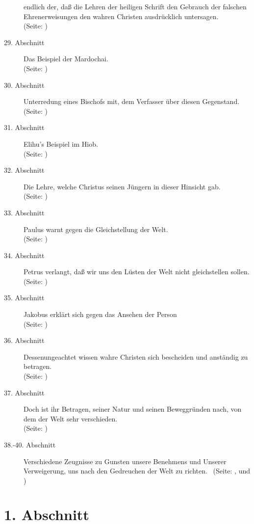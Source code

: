 \begin{description}
endlich der,
daß die Lehren der heiligen Schrift den Gebrauch der falschen Ehrenerweisungen
den wahren Christen ausdrücklich untersagen.
\\ (Seite: \pageref{kap9_ab28})
\item[29. Abschnitt] Das Beispiel der Mardochai.
\\ (Seite: \pageref{kap9_ab29})
\item[30. Abschnitt] Unterredung eines Bischofs mit, dem Verfasser über diesen
Gegenstand.
\\ (Seite: \pageref{kap9_ab30})
\item[31. Abschnitt] Elihu's Beispiel im Hiob.
\\ (Seite: \pageref{kap9_ab31})
\item[32. Abschnitt] Die Lehre, welche Christus seinen Jüngern in dieser
Hinsicht gab.
\\ (Seite: \pageref{kap9_ab32})
\item[33. Abschnitt] Paulus warnt gegen die Gleichstellung der Welt.
\\ (Seite: \pageref{kap9_ab33})
\item[34. Abschnitt] Petrus verlangt, daß wir uns den Lüsten der Welt nicht
gleichstellen sollen.
\\ (Seite: \pageref{kap9_ab34})
\item[35. Abschnitt] Jakobus erklärt sich gegen das Ansehen der Person
\\ (Seite: \pageref{kap9_ab35})
\item[36. Abschnitt] Dessenungeachtet wissen wahre Christen sich bescheiden und
anständig zu betragen.
\\ (Seite: \pageref{kap9_ab36})
\item[37. Abschnitt] Doch ist ihr Betragen, seiner Natur und seinen Beweggründen
nach, von dem der Welt sehr verschieden.
\\ (Seite: \pageref{kap9_ab37})
\item[38.-40. Abschnitt] Verschiedene Zeugnisse zu Gunsten unsere Benehmens und
Unserer Verweigerung, uns nach den Gedreuchen der Welt zu richten.
\  (Seite: \pageref{kap9_ab38}, \pageref{kap9_ab39} und \pageref{kap9_ab40})

\end{description}
\normalsize

\section{1. Abschnitt} \label{kap9_ab1}

